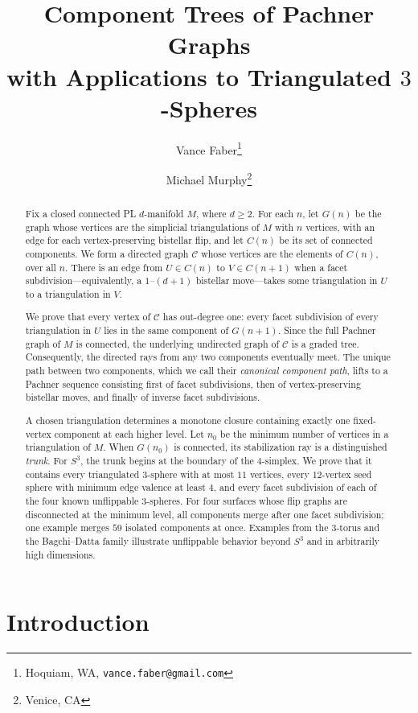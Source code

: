 \documentclass[11pt]{article}
\title{Component Trees of Pachner Graphs\\
with Applications to Triangulated \(3\)-Spheres}
\author{Vance Faber\thanks{Hoquiam, WA, \texttt{vance.faber@gmail.com}}
\and Michael Murphy\thanks{Venice, CA}}
\date{}
\theoremstyle{remark}
\theoremstyle{plain}
\begin{document}
\maketitle

\begin{abstract}
Fix a closed connected PL \(d\)-manifold \(M\), where \(d\ge2\).  For each
\(n\), let \(G(n)\) be the graph whose vertices are the simplicial
triangulations of \(M\) with \(n\) vertices, with an edge for each
vertex-preserving bistellar flip, and let \(C(n)\) be its set of connected
components.  We form a directed graph \(\mathcal C\) whose vertices are the
elements of \(C(n)\), over all \(n\).  There is an edge from
\(U\in C(n)\) to \(V\in C(n+1)\) when a facet subdivision---equivalently, a
\(1\)--\((d+1)\) bistellar move---takes some triangulation in \(U\) to a
triangulation in \(V\).

We prove that every vertex of \(\mathcal C\) has out-degree one: every facet
subdivision of every triangulation in \(U\) lies in the same component of
\(G(n+1)\).  Since the full Pachner graph of \(M\) is connected, the
underlying undirected graph of \(\mathcal C\) is a graded tree.  Consequently,
the directed rays from any two components eventually meet.  The unique path
between two components, which we call their \emph{canonical component path},
lifts to a Pachner sequence consisting first of facet subdivisions, then of
vertex-preserving bistellar moves, and finally of inverse facet subdivisions.

A chosen triangulation determines a monotone closure containing exactly one
fixed-vertex component at each higher level.  Let \(n_0\) be the minimum
number of vertices in a triangulation of \(M\).  When \(G(n_0)\) is connected,
its stabilization ray is a distinguished \emph{trunk}.  For \(S^3\), the
trunk begins at the boundary of the \(4\)-simplex.  We prove that it contains
every triangulated \(3\)-sphere with at most \(11\) vertices, every
\(12\)-vertex seed sphere with minimum edge valence at least \(4\), and every
facet subdivision of each of the four known unflippable \(3\)-spheres.  For
four surfaces whose flip graphs are disconnected at the minimum level, all
components merge after one facet subdivision; one example merges \(59\)
isolated components at once.  Examples from the \(3\)-torus and the
Bagchi--Datta family illustrate unflippable behavior beyond \(S^3\) and in
arbitrarily high dimensions.
\end{abstract}

\section{Introduction}
\label{sec:introduction}
\end{document}
